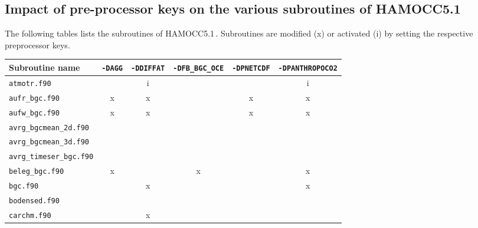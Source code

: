 \documentclass[11pt,a4paper,fleqn,twoside]{article}
\newcommand{\ham}{HAMOCC5.1\,}
\begin{document}
\begin{appendix}
\newpage

\section{\label{effect_of_preprocessor_options}Impact of pre-processor keys on the various subroutines of \ham}

The following tables lists the subroutines of \ham. Subroutines are modified (x) or activated (i) by setting the
respective preprocessor keys.\\

\footnotesize
\begin{tabular}{|l|c|c|c|c|c|}\hline
Subroutine name                 &{\tt -DAGG}&{\tt -DDIFFAT}&{\tt -DFB\_BGC\_OCE}&{\tt -DPNETCDF}&{\tt -DPANTHROPOCO2}\\ \hline
{\tt atmotr.f90      }          &           &    i         &                    &               &        i          \\     
{\tt aufr\_bgc.f90         }    &     x     &    x         &                    &       x       &        x          \\       
{\tt aufw\_bgc.f90         }    &     x     &    x         &                    &       x       &        x          \\       
{\tt avrg\_bgcmean\_2d.f90 }    &           &              &                    &               &                   \\        
{\tt avrg\_bgcmean\_3d.f90 }    &           &              &                    &               &                   \\      
{\tt avrg\_timeser\_bgc.f90}    &           &              &                    &               &                   \\  \hline
{\tt beleg\_bgc.f90        }    &     x     &              &         x          &               &        x          \\
{\tt bgc.f90              }     &           &    x         &                    &               &        x          \\
{\tt  bodensed.f90        }     &           &              &                    &               &                   \\ \hline
{\tt  carchm.f90          }     &           &    x         &                    &               &                   \\

\end{tabular}
\end{appendix}
\end{document}
